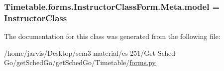 \subsubsection[{\texorpdfstring{model}{model}}]{\setlength{\rightskip}{0pt plus 5cm}Timetable.\+forms.\+Instructor\+Class\+Form.\+Meta.\+model = {\bf Instructor\+Class}\hspace{0.3cm}{\ttfamily [static]}}\hypertarget{classTimetable_1_1forms_1_1InstructorClassForm_1_1Meta_ac50b27b88d468035f13912906a3f6e1f}{}\label{classTimetable_1_1forms_1_1InstructorClassForm_1_1Meta_ac50b27b88d468035f13912906a3f6e1f}


The documentation for this class was generated from the following file\+:\begin{DoxyCompactItemize}
\item 
/home/jarvis/\+Desktop/sem3 material/cs 251/\+Get-\/\+Sched-\/\+Go/get\+Sched\+Go/get\+Sched\+Go/\+Timetable/\hyperlink{Timetable_2forms_8py}{forms.\+py}\end{DoxyCompactItemize}
